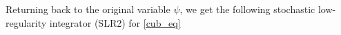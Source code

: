 \documentclass[a4paper]{amsart}
\begin{document}

Returning back to the original variable $\psi$, we get the following stochastic low-regularity integrator (SLR2) for \eqref{cub_eq}
\end{document}

